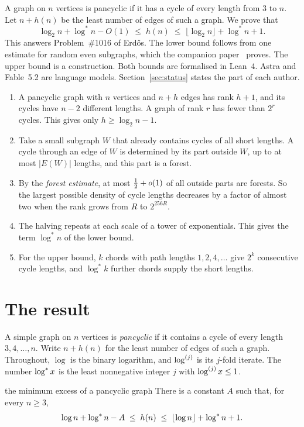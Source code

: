 \documentclass[11pt]{article}
\begin{document}
\maketitleblock

A graph on $n$ vertices is pancyclic if it has a cycle of every length from $3$ to $n$. Let
$n+h(n)$ be the least number of edges of such a graph. We prove that
\[
  \log_2n+\log^{*}n-O(1)\;\le\;h(n)\;\le\;\lfloor\log_2n\rfloor+\log^{*}n+1 .
\]
This answers Problem~\#1016 of Erd\H{o}s. The lower bound follows from one estimate for random
even subgraphs, which the companion paper~\cite{Forest} proves. The upper bound is a
construction. Both bounds are formalised in Lean~4. Astra and Fable~5.2 are language models.
Section~\ref{sec:status} states the part of each author.

\begin{enumerate}[leftmargin=1.6em]
\item A pancyclic graph with $n$ vertices and $n+h$ edges has rank $h+1$, and its cycles have
$n-2$ different lengths. A graph of rank $r$ has fewer than $2^{r}$ cycles. This gives only
$h\ge\log_2n-1$.
\item Take a small subgraph $W$ that already contains cycles of all short lengths. A cycle through
an edge of $W$ is determined by its part outside $W$, up to at most $|E(W)|$ lengths, and this
part is a forest.
\item By the \emph{forest estimate}, at most $\tfrac12+o(1)$ of all outside parts are forests. So
the largest possible density of cycle lengths decreases by a factor of almost two when the rank
grows from $R$ to $2^{256R}$.
\item The halving repeats at each scale of a tower of exponentials. This gives the term
$\log^{*}n$ of the lower bound.
\item For the upper bound, $k$ chords with path lengths $1,2,4,\dots$ give $2^{k}$ consecutive
cycle lengths, and $\log^{*}k$ further chords supply the short lengths.
\end{enumerate}

\section{The result}

A simple graph on $n$ vertices is \emph{pancyclic} if it contains a cycle of every length
$3,4,\dots,n$. Write $n+h(n)$ for the least number of edges of such a graph. Throughout, $\log$ is
the binary logarithm, and $\log^{(j)}$ is its $j$-fold iterate. The number $\log^{*} x$ is the least
nonnegative integer $j$ with $\log^{(j)}x\le1$.

\begin{maintheorem}{the minimum excess of a pancyclic graph}\label{thm:main}
There is a constant $A$ such that, for every $n\ge3$,
\[
  \log n+\log^{*} n-A\;\le\;h(n)\;\le\;\lfloor\log n\rfloor+\log^{*} n+1 .
\]
\end{maintheorem}
\end{document}
